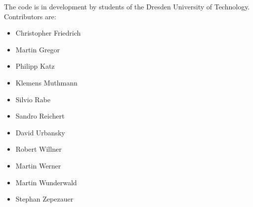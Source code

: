 \documentclass[a4paper,twoside]{book}      %
\begin{document}
The code is in development by students of the Dresden University of Technology. Contributors are:
\begin{itemize}
\item Christopher Friedrich
\item Martin Gregor
\item Philipp Katz
\item Klemens Muthmann
\item Silvio Rabe
\item Sandro Reichert
\item David Urbansky
\item Robert Willner
\item Martin Werner
\item Martin Wunderwald
\item Stephan Zepezauer
\end{itemize}



\end{document}
